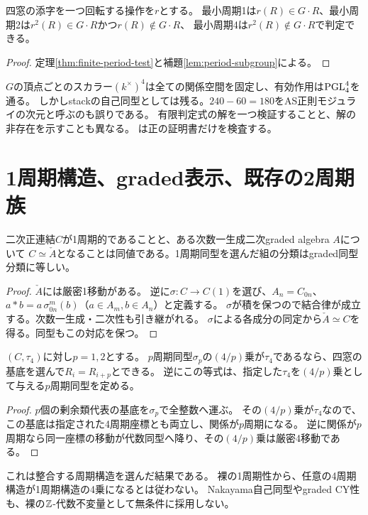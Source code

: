 \begin{corollary}\label{cor:period-orbits}
四窓の添字を一つ回転する操作を$r$とする。
最小周期1は$r(R)\in G\cdot R$、最小周期2は$r^2(R)\in G\cdot R$かつ$r(R)\notin G\cdot R$、
最小周期4は$r^2(R)\notin G\cdot R$で判定できる。
\end{corollary}
\begin{proof}
定理\ref{thm:finite-period-test}と補題\ref{lem:period-subgroup}による。
\end{proof}
\begin{remark}
$G$の頂点ごとのスカラー$(k^\times)^4$は全ての関係空間を固定し、有効作用は$\operatorname{PGL}_4^4$を通る。
しかしstackの自己同型としては残る。$240-60=180$をAS正則モジュライの次元と呼ぶのも誤りである。
有限判定式の解を一つ検証することと、解の非存在を示すことも異なる。
は正の証明書だけを検査する。
\end{remark}

\section{1周期構造、graded表示、既存の2周期族}
\begin{proposition}\label{prop:graded-period}
二次正連結$C$が1周期的であることと、ある次数一生成二次graded algebra $A$について
$C\simeq\check A$となることは同値である。1周期同型を選んだ組の分類はgraded同型分類に等しい。
\end{proposition}
\begin{proof}
$\check A$には厳密1移動がある。
逆に$\sigma:C\to C(1)$を選び、$A_n=C_{0n}$、
$a*b=a\,\sigma^m_{0n}(b)$（$a\in A_m,b\in A_n$）と定義する。
$\sigma$が積を保つので結合律が成立する。次数一生成・二次性も引き継がれる。
$\sigma$による各成分の同定から$\check A\simeq C$を得る。同型もこの対応を保つ。
\end{proof}

\begin{proposition}\label{prop:compatible-periodic-windows}
$(C,\tau_4)$に対し$p=1,2$とする。
$p$周期同型$\sigma_p$の$(4/p)$乗が$\tau_4$であるなら、四窓の基底を選んで$R_i=R_{i+p}$とできる。
逆にこの等式は、指定した$\tau_4$を$(4/p)$乗として与える$p$周期同型を定める。
\end{proposition}
\begin{proof}
$p$個の剰余類代表の基底を$\sigma_p$で全整数へ運ぶ。
その$(4/p)$乗が$\tau_4$なので、この基底は指定された4周期座標とも両立し、関係が$p$周期になる。
逆に関係が$p$周期なら同一座標の移動が代数同型へ降り、その$(4/p)$乗は厳密4移動である。
\end{proof}
\begin{remark}
これは整合する周期構造を選んだ結果である。
裸の1周期性から、任意の4周期構造が1周期構造の4乗になるとは従わない。
Nakayama自己同型やgraded CY性も、裸の$\mathbb Z$-代数不変量として無条件に採用しない。
\end{remark}

